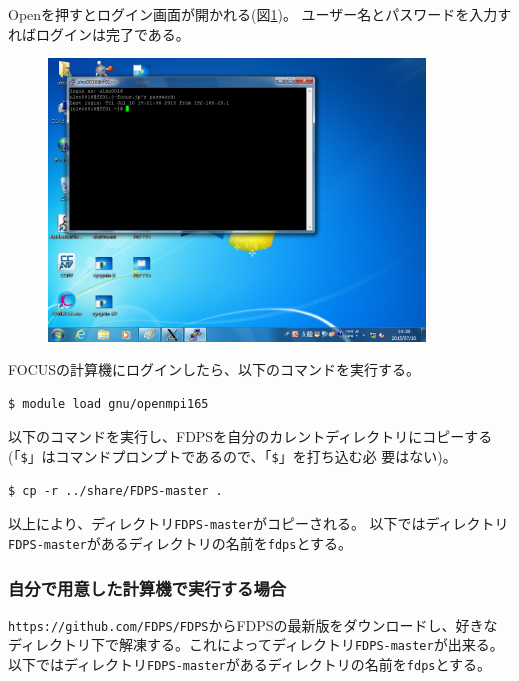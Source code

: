 \documentclass[12pt,a4paper,dvipdfmx]{jarticle}
\begin{document}
Openを押すとログイン画面が開かれる(図\ref{fig:login2})。
ユーザー名とパスワードを入力すればログインは完了である。
\begin{figure}
  \begin{center}
    \includegraphics[clip, width=10.0cm]{fig/login2.png}
  \end{center}
  \caption{}
  \label{fig:login2}
\end{figure}

FOCUSの計算機にログインしたら、以下のコマンドを実行する。
\begin{screen}
\begin{verbatim}
$ module load gnu/openmpi165
\end{verbatim}
\end{screen}

以下のコマンドを実行し、FDPSを自分のカレントディレクトリにコピーする
(「\verb|$|」はコマンドプロンプトであるので、「\verb|$|」を打ち込む必
要はない)。
\begin{screen}
\begin{verbatim}
$ cp -r ../share/FDPS-master .
\end{verbatim}
\end{screen}
以上により、ディレクトリ\texttt{FDPS-master}がコピーされる。
以下ではディレクトリ\texttt{FDPS-master}があるディレクトリの名前を\texttt{fdps}とする。

\subsubsection{自分で用意した計算機で実行する場合}
\texttt{https://github.com/FDPS/FDPS}からFDPSの最新版をダウンロードし、好きな
ディレクトリ下で解凍する。これによってディレクトリ\texttt{FDPS-master}が出来る。
以下ではディレクトリ\texttt{FDPS-master}があるディレクトリの名前を\texttt{fdps}とする。
\end{document}
